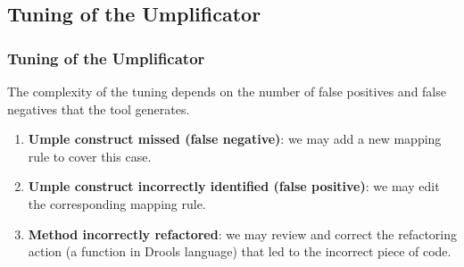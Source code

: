 \documentclass[xcolor=table]{beamer}
\begin{document}
\subsection{Tuning of the Umplificator} 
\begin{frame}
\frametitle{Tuning of the Umplificator}
The complexity of the tuning depends on the number of false positives and false negatives that the tool generates.

\begin{enumerate}
  \item \textbf{Umple construct  missed  (false negative)}: we may add a new mapping rule to cover this case.
  \item \textbf{Umple construct  incorrectly identified (false positive)}: we may edit the corresponding mapping rule.
  \item \textbf{Method  incorrectly refactored}: we may review and correct the refactoring action (a function in Drools language) that led to the incorrect piece of code.
\end{enumerate}
\end{frame}

\end{document}
